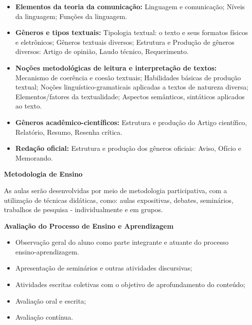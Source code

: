 \begin{itemize}
 \item \textbf{Elementos da teoria da comunicação:} Linguagem e comunicação; Níveis da linguagem; Funções da linguagem.

 \item \textbf{Gêneros e tipos textuais:} Tipologia textual: o texto e seus formatos físicos e eletrônicos; Gêneros textuais diversos; Estrutura e Produção de gêneros diversos: Artigo de opinião, Laudo técnico, Requerimento.

 \item \textbf{Noções metodológicas de leitura e interpretação de textos:} Mecanismo de coerência e coesão textuais; Habilidades básicas de produção textual; Noções linguístico-gramaticais aplicadas a textos de natureza diversa; Elementos/fatores da textualidade; Aspectos semânticos, sintáticos aplicados ao texto.

 \item \textbf{Gêneros acadêmico-científicos:} Estrutura e produção do Artigo científico, Relatório, Resumo, Resenha crítica.

 \item \textbf{Redação oficial:} Estrutura e produção dos gêneros oficiais: Aviso, Ofício e Memorando.

\end{itemize}



\begin{snugshade}\begin{center}\textbf{
    Metodologia de Ensino
}\end{center}\end{snugshade}

\noindent
 As aulas serão desenvolvidas por meio de metodologia participativa, com a utilização de técnicas didáticas, como: aulas expositivas, debates, seminários, trabalhos de pesquisa - individualmente e em grupos.

\begin{snugshade}\begin{center}\textbf{
    Avaliação do Processo de Ensino e Aprendizagem
}\end{center}\end{snugshade}

\noindent
\begin{itemize}
	\item Observação geral do aluno como parte integrante e atuante do processo ensino-aprendizagem.
	\item Apresentação de seminários e outras atividades discursivas;
	\item Atividades escritas coletivas com o objetivo de aprofundamento do conteúdo;
	\item Avaliação oral e escrita;
	\item Avaliação contínua.
\end{itemize}

